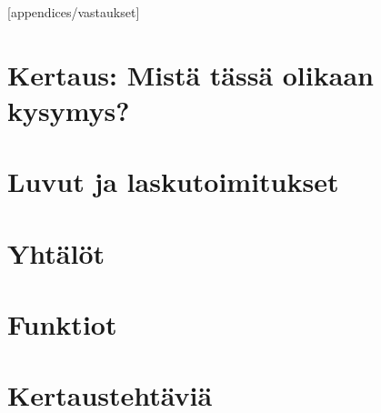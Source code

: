 [appendices/vastaukset]

\chapter*{Kertaus: Mistä tässä olikaan kysymys?}
    
    

\chapter{Luvut ja laskutoimitukset}
    
    
    
    
    
    

\chapter{Yhtälöt}
    
    
    
    
    

\chapter{Funktiot}
    
    
    
    

\chapter{Kertaustehtäviä}
    
    
    

